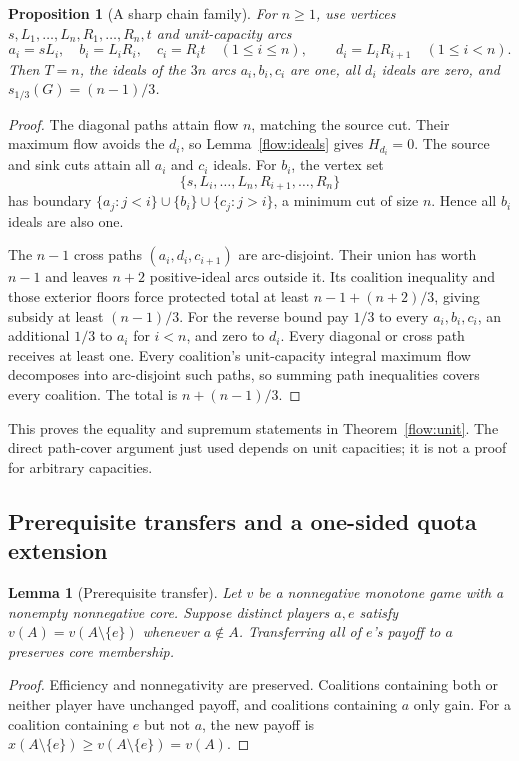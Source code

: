 \documentclass[11pt]{article}
\newtheorem{lemma}[theorem]{Lemma}
\newtheorem{proposition}[theorem]{Proposition}
\theoremstyle{remark}
\begin{document}
\begin{proposition}[A sharp chain family]\label{flow:chain}
For $n\ge1$, use vertices $s,L_1,\ldots,L_n,R_1,\ldots,R_n,t$ and
unit-capacity arcs
\[
 a_i=sL_i,\quad b_i=L_iR_i,\quad c_i=R_it\quad(1\le i\le n),
 \qquad d_i=L_iR_{i+1}\quad(1\le i<n).
\]
Then $T=n$, the ideals of the $3n$ arcs $a_i,b_i,c_i$ are one, all
$d_i$ ideals are zero, and $s_{1/3}(G)=(n-1)/3$.
\end{proposition}
\begin{proof}
The diagonal paths attain flow $n$, matching the source cut. Their
maximum flow avoids the $d_i$, so Lemma~\ref{flow:ideals} gives
$H_{d_i}=0$. The source and sink cuts attain all $a_i$ and $c_i$ ideals.
For $b_i$, the vertex set
\[
           \{s,L_i,\ldots,L_n,R_{i+1},\ldots,R_n\}
\]
has boundary $\{a_j:j<i\}\cup\{b_i\}\cup\{c_j:j>i\}$, a minimum
cut of size $n$. Hence all $b_i$ ideals are also one.

The $n-1$ cross paths $(a_i,d_i,c_{i+1})$ are arc-disjoint. Their union
has worth $n-1$ and leaves $n+2$ positive-ideal arcs outside it. Its
coalition inequality and those exterior floors force protected total at
least $n-1+(n+2)/3$, giving subsidy at least $(n-1)/3$.
For the reverse bound pay $1/3$ to every $a_i,b_i,c_i$, an additional
$1/3$ to $a_i$ for $i<n$, and zero to $d_i$. Every diagonal or cross
path receives at least one. Every coalition's unit-capacity integral
maximum flow decomposes into arc-disjoint such paths, so summing path
inequalities covers every coalition. The total is $n+(n-1)/3$.
\end{proof}
This proves the equality and supremum statements in
Theorem~\ref{flow:unit}. The direct path-cover argument just used depends
on unit capacities; it is not a proof for arbitrary capacities.

\subsection{Prerequisite transfers and a one-sided quota extension}
\begin{lemma}[Prerequisite transfer]\label{flow:transfer}
Let $v$ be a nonnegative monotone game with a nonempty nonnegative core.
Suppose distinct players $a,e$ satisfy
$v(A)=v(A\setminus\{e\})$ whenever $a\notin A$. Transferring all of
$e$'s payoff to $a$ preserves core membership.
\end{lemma}
\begin{proof}
Efficiency and nonnegativity are preserved. Coalitions containing both
or neither player have unchanged payoff, and coalitions containing $a$
only gain. For a coalition containing $e$ but not $a$, the new payoff is
$x(A\setminus\{e\})\ge v(A\setminus\{e\})=v(A)$.
\end{proof}
\end{document}
